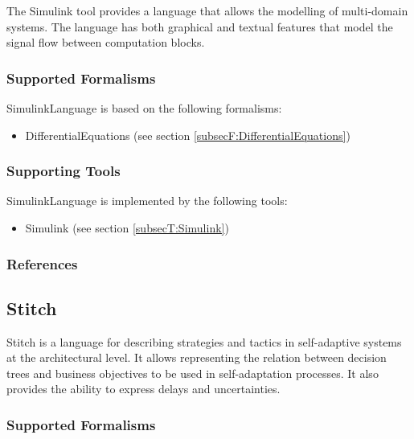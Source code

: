 \author{Stefan}

The Simulink tool provides a language that allows the modelling of multi-domain systems.
The language has both graphical and textual features that model the signal flow between computation blocks.

\subsubsection{Supported Formalisms}

SimulinkLanguage is based on the following formalisms:
\begin{itemize}
	\item DifferentialEquations (see section \ref{subsecF:DifferentialEquations})
\end{itemize}


\subsubsection{Supporting Tools}

SimulinkLanguage is implemented by the following tools:
\begin{itemize}
	\item Simulink (see section \ref{subsecT:Simulink})
\end{itemize}


\subsubsection{References}





\subsection{Stitch}
\label{subsecL:Stitch}

\author{Rima}
Stitch is a language for describing strategies and tactics in self-adaptive systems
at the architectural level. It allows representing the relation 
between decision trees and business objectives to be used in self-adaptation processes. It also
provides the ability to express delays and uncertainties.

\subsubsection{Supported Formalisms}


